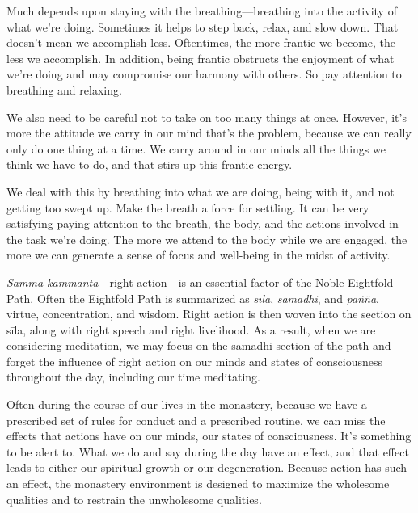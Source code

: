 Much depends upon staying with the breathing---breathing into the 
activity of what we're doing. Sometimes it helps to step back, relax, 
and slow down. That doesn't mean we accomplish less. Oftentimes, the 
more frantic we become, the less we accomplish. In addition, being 
frantic obstructs the enjoyment of what we're doing and may compromise 
our harmony with others. So pay attention to breathing and relaxing.

We also need to be careful not to take on too many things at once. 
However, it's more the attitude we carry in our mind that's the 
problem, because we can really only do one thing at a time. We carry 
around in our minds all the things we think we have to do, and that 
stirs up this frantic energy.

We deal with this by breathing into what we are doing, being with it, 
and not getting too swept up. Make the breath a force for settling. It 
can be very satisfying paying attention to the breath, the body, and 
the actions involved in the task we're doing. The more we attend to the 
body while we are engaged, the more we can generate a sense of focus 
and well-being in the midst of activity.


\emph{Sammā kammanta}---right action---is an essential factor of the 
Noble Eightfold Path. Often the Eightfold Path is summarized as 
\emph{sīla}, \emph{samādhi}, and \emph{paññā}, virtue, 
concentration, and wisdom. Right action is then woven into the section 
on sīla, along with right speech and right livelihood. As a result, 
when we are considering meditation, we may focus on the samādhi 
section of the path and forget the influence of right action on our 
minds and states of consciousness throughout the day, including our 
time meditating.

Often during the course of our lives in the monastery, because we have 
a prescribed set of rules for conduct and a prescribed routine, we can 
miss the effects that actions have on our minds, our states of 
consciousness. It's something to be alert to. What we do and say during 
the day have an effect, and that effect leads to either our spiritual 
growth or our degeneration. Because action has such an effect, the 
monastery environment is designed to maximize the wholesome qualities 
and to restrain the unwholesome qualities.

